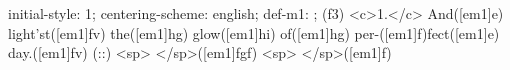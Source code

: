 initial-style: 1;
centering-scheme: english;
def-m1: \grealign;
(f3) <c>1.</c> And([em1]e) light'st([em1]fv) the([em1]hg) glow([em1]hi) of([em1]hg) per-([em1]f)fect([em1]e) day.([em1]fv) (::) <sp> </sp>([em1]fgf) <sp>   </sp>([em1]f)